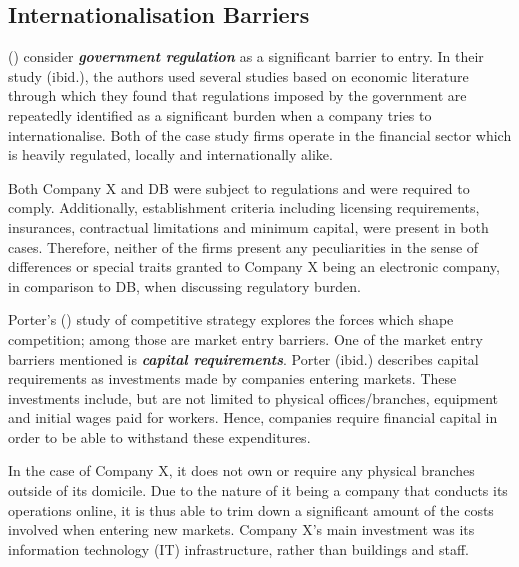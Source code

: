 \documentclass[11pt,a4paper]{article}
\begin{document}
{{{\subsection{Internationalisation Barriers}
\vspace{-1mm}
\label{int_barriers}
 \par

 \citeauthor{karakayaBarriersEntryMarket1989} (\citeyear{karakayaBarriersEntryMarket1989}) consider \textbf{\textit{government regulation}} as a significant barrier to entry. In their study (ibid.), the authors used several studies based on economic literature through which they found that regulations imposed by the government are repeatedly identified as a significant burden when a company tries to internationalise. Both of the case study firms operate in the financial sector which is heavily regulated, locally and internationally alike. \par
Both Company X and DB were subject to regulations and were required to comply. Additionally, establishment criteria including licensing requirements, insurances, contractual limitations and minimum capital, were present in both cases. Therefore, neither of the firms present any peculiarities in the sense of differences or special traits granted to Company X being an electronic company, in comparison to DB, when discussing regulatory burden. \par
Porter's (\citeyear{porterCompetitiveStrategyTechniques1980}) study of competitive strategy explores the forces which shape competition; among those are market entry barriers. One of the market entry barriers mentioned is \textbf{\textit{capital requirements}}. Porter (ibid.) describes capital requirements as investments made by companies entering markets. These investments include, but are not limited to physical offices/branches, equipment and initial wages paid for workers. Hence, companies require financial capital in order to be able to withstand these expenditures. \par
In the case of Company X, it does not own or require any physical branches outside of its domicile. Due to the nature of it being a company that conducts its operations online, it is thus able to trim down a significant amount of the costs involved when entering new markets. Company X's main investment was its information technology (IT) infrastructure, rather than buildings and staff.  \par
}}}
\end{document}
